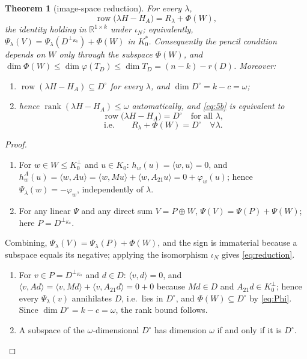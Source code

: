 \documentclass[journal]{IEEEtran}
\theoremstyle{plainn}
\newtheorem{thm}{Theorem}
\theoremstyle{remark}
\newcommand{\row}{\operatorname{row}}
\newcommand{\rank}{\operatorname{rank}}
\begin{document}
\begin{thm}[image-space reduction]\label{thm:reduction}
For every $\lambda$,
\begin{equation}\label{eq:reduction}
\row\bigl(\lambda H-H_A\bigr)=R_\lambda+\Phi(W),
\end{equation}
the identity holding in $\mathbb R^{1\times k}$ under $\iota_N$; equivalently,
$\Psi_\lambda(V)=\Psi_\lambda(D^{\perp_{K_0}})+\Phi(W)$ in $K_0^*$. Consequently the pencil condition
depends on $W$ only through the subspace $\Phi(W)$, and
$\dim\Phi(W)\le\dim\varphi(T_D)\le\dim T_D=(n-k)-r(D)$. Moreover:
\begin{enumerate}[label=\arabic*.,start=3,leftmargin=*,itemsep=1pt,topsep=2pt]
\item $\row(\lambda H-H_A)\subseteq D^\circ$ for every $\lambda$, and $\dim D^\circ=k-c=\omega$;
\item hence $\rank(\lambda H-H_A)\le\omega$ automatically, and \eqref{eq:5b} is equivalent to
\[
\row\bigl(\lambda H-H_A\bigr)=D^\circ\quad\text{for all }\lambda,
\]
\[
\text{i.e.}\qquad R_\lambda+\Phi(W)=D^\circ\quad\forall\lambda.
\]
\end{enumerate}
\end{thm}

\begin{proof}
\begin{enumerate}[label=\arabic*.,leftmargin=*,itemsep=1pt,topsep=2pt]
\item For $w\in W\le K_0^\perp$ and $u\in K_0$: $h_w(u)=\langle w,u\rangle=0$, and
$h^A_w(u)=\langle w,Au\rangle=\langle w,Mu\rangle+\langle w,A_{21}u\rangle=0+\varphi_w(u)$; hence
$\Psi_\lambda(w)=-\varphi_w$, independently of $\lambda$.
\item For any linear $\Psi$ and any direct sum $V=P\oplus W$, $\Psi(V)=\Psi(P)+\Psi(W)$; here
$P=D^{\perp_{K_0}}$.
\end{enumerate}
Combining, $\Psi_\lambda(V)=\Psi_\lambda(P)+\Phi(W)$, and the sign is immaterial because a subspace
equals its negative; applying the isomorphism $\iota_N$ gives \eqref{eq:reduction}.
\begin{enumerate}[label=\arabic*.,start=3,leftmargin=*,itemsep=1pt,topsep=2pt]
\item For $v\in P=D^{\perp_{K_0}}$ and $d\in D$: $\langle v,d\rangle=0$, and
$\langle v,Ad\rangle=\langle v,Md\rangle+\langle v,A_{21}d\rangle=0+0$ because $Md\in D$ and
$A_{21}d\in K_0^\perp$; hence every $\Psi_\lambda(v)$ annihilates $D$, i.e.\ lies in $D^\circ$, and
$\Phi(W)\subseteq D^\circ$ by \eqref{eq:Phi}. Since $\dim D^\circ=k-c=\omega$, the rank bound follows.
\item A subspace of the $\omega$-dimensional $D^\circ$ has dimension $\omega$ if and only if it is
$D^\circ$.
\end{enumerate}
\end{proof}
\end{document}
